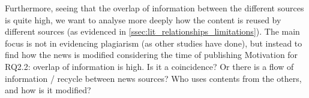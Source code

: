 Furthermore, seeing that the overlap of information between the different sources is quite high, we want to analyse more deeply how the content is reused by different sources (as evidenced in \ref{ssec:lit_relationships_limitations}). The main focus is not in evidencing plagiarism (as other studies have done), but instead to find how the news is modified considering the time of publishing
Motivation for RQ2.2: overlap of information is high. Is it a coincidence? Or there is a flow of information / recycle between news sources? Who uses contents from the others, and how is it modified?


















